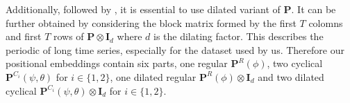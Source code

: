 Additionally, followed by \citet{huang2022encoding}, it is essential to use dilated variant of $\textbf{P}$. It can be further obtained by considering the block matrix formed by the first $T$ colomns and first $T$ rows of $\textbf{P} \otimes \textbf{I}_d$ where $d$ is the dilating factor. This describes the periodic of long time series, especially for the dataset used by us. Therefore our positional embeddings contain six parts, one regular $\textbf{P}^R(\phi)$, two cyclical $\textbf{P}^{C_i}(\psi,\theta)$ for $i \in \{1,2\}$, one dilated regular $\textbf{P}^R(\phi) \otimes \textbf{I}_d$ and two dilated cyclical $\textbf{P}^{C_i}(\psi,\theta) \otimes \textbf{I}_d$ for $i \in \{1,2\}$.




